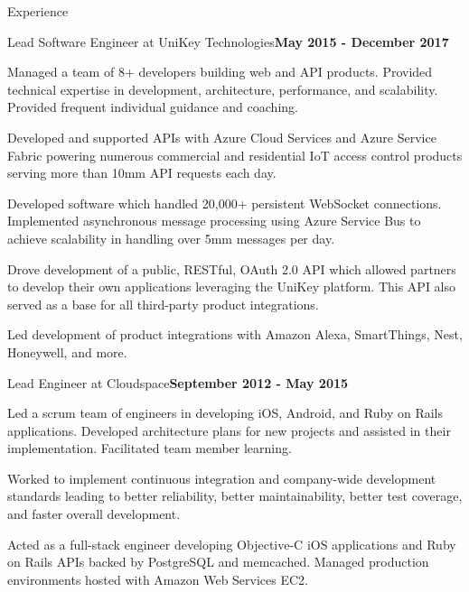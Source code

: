 \documentclass{resume} %
\begin{document}
\begin{rSection}{Experience}


\begin{rSubsection}{Lead Software Engineer at UniKey Technologies}{\bf May 2015 - December 2017}{}{}

\item Managed a team of 8+ developers building web and API products.  Provided technical expertise in development, architecture,  performance, and scalability.  Provided frequent individual guidance and coaching.
\item Developed and supported APIs with Azure Cloud Services and Azure Service Fabric powering numerous commercial and residential IoT access control products serving more than 10mm API requests each day.
\item Developed software which handled 20,000+ persistent WebSocket connections. Implemented asynchronous message processing using Azure Service Bus to achieve scalability in handling over 5mm messages per day.
\item Drove development of a public, RESTful, OAuth 2.0 API which allowed partners to develop their own applications leveraging the UniKey platform.  This API also served as a base for all third-party product integrations.
\item Led development of product integrations with Amazon Alexa, SmartThings, Nest, Honeywell, and more.

\end{rSubsection}


\begin{rSubsection}{Lead Engineer at Cloudspace}{\bf September 2012 - May 2015}{}{}

\item Led a scrum team of engineers in developing iOS, Android, and Ruby on Rails applications.  Developed architecture plans for new projects and assisted in their implementation. Facilitated team member learning.
\item Worked to implement continuous integration and company-wide development standards leading to better reliability, better maintainability, better test coverage, and faster overall development.
\item Acted as a full-stack engineer developing Objective-C iOS applications and Ruby on Rails APIs backed by PostgreSQL and memcached. Managed production environments hosted with Amazon Web Services EC2.


\end{rSubsection}
\end{rSection}
\end{document}
